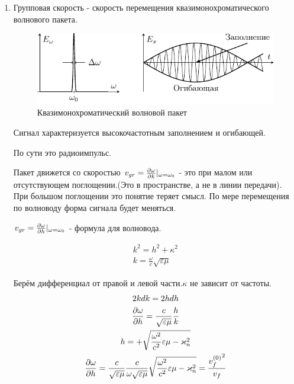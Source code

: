\begin{enumerate}
\item Групповая скорость - скорость перемещения квазимонохроматического волнового пакета. 	
\begin{figure}[h!]
  \centering
  \includegraphics[scale=1]{img/lect3_ris8}
  \caption{Квазимонохроматический волновой пакет}
  \label{fig:lect3:8}
\end{figure}

Сигнал характеризуется высокочастотным заполнением и огибающей.

По сути это радиоимпульс.

Пакет движется со скоростью $ v_{gr} = \pdv{\omega}{k}\vert_{\omega = \omega_{0}} $ - это при малом или отсутствующем поглощении.(Это в пространстве, а не в линии передачи).
При большом поглощении это понятие теряет смысл. По мере перемещения по волноводу форма сигнала будет меняться.

$v_{gr} = \pdv{\omega}{h}\vert_{\omega = \omega_{0}} $ - формула для волновода. 

\begin{gather}
k^2 = h^2 + \kappa^2\\
%
k = \frac{\omega}{c} \sqrt{ \varepsilon \mu}
\end{gather}

Берём дифференциал от правой и левой части.$\kappa$  не зависит от частоты.
\begin{gather*}
2k dk = 2h dh\\
\pdv{\omega}{h} = \frac{c}{\sqrt{\varepsilon \mu}} \frac{h}{k}\\
h = + \sqrt{\frac{\omega^2}{c^2} \varepsilon \mu -\varkappa^2_n}\\
\pdv{\omega}{h} = \frac{c}{\sqrt{\varepsilon \mu}} \frac{c}{\omega \sqrt{\varepsilon \mu}} \sqrt{\frac{\omega^2}{c^2} \varepsilon \mu -\varkappa^2_n} = \frac{{v_f^{(0)}}^2}{v_f}
\end{gather*}


\end{enumerate}
